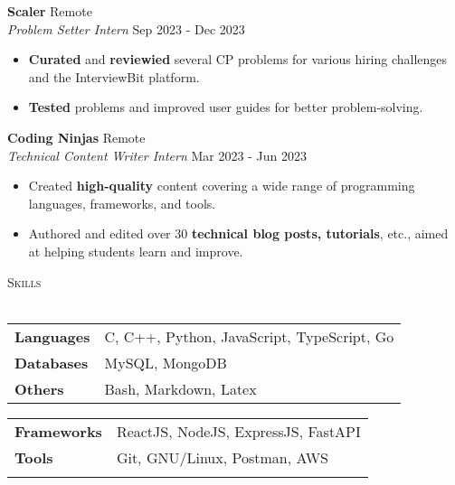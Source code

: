 \documentclass[a4paper]{article}
\newcommand{\bulletSep} { \vspace{2mm} }
\newcommand{\sectionSep} { \vspace{3mm} }
\newcommand{\lineunder} {
    \vspace*{-8pt} \\
    \hspace*{-15pt} \hrulefill \\
}
\newcommand{\header} [1] {
    {\hspace*{-18pt}\vspace*{6pt} {
        \fontfamily{qcs}\selectfont \large \scshape #1
    }}
    \vspace*{-6pt} \lineunder
    \vspace{1.1mm}
}
\newcommand{\experienceItem}[5]{
    \textbf{#1} \hfill #2 \\
    \textit{#3} \hfill #4 \\
    #5
}
\begin{document}
\experienceItem{Scaler}{Remote}{Problem Setter Intern}{Sep 2023 - Dec 2023}{
    \begin{itemize}
        \item \textbf{Curated} and \textbf{reviewied} several CP problems for various hiring challenges and the InterviewBit platform.
        \item \textbf{Tested} problems and improved user guides for better problem-solving.
    \end{itemize}
}
\bulletSep

\experienceItem{Coding Ninjas}{Remote}{Technical Content Writer Intern}{Mar 2023 - Jun 2023}{
    \begin{itemize}
        \item Created \textbf{high-quality} content covering a wide range of programming languages, frameworks, and tools.
        \item Authored and edited over 30 \textbf{technical blog posts, tutorials}, etc., aimed at helping students learn and improve.
    \end{itemize}
}

\sectionSep


\header{Skills}
\begin{minipage}[t]{0.51\textwidth}
    \begin{tabular}{@{}ll}
        \textbf{Languages} & C, C++, Python, JavaScript, TypeScript, Go \\
        \textbf{Databases} & MySQL, MongoDB                             \\
        \textbf{Others}    & Bash, Markdown, Latex
    \end{tabular}
\end{minipage}
\hfill
\begin{minipage}[t]{0.47\textwidth}
    \begin{tabular}{@{}ll}
        \textbf{Frameworks} & ReactJS, NodeJS, ExpressJS, FastAPI \\
        \textbf{Tools}      & Git, GNU/Linux, Postman, AWS        \\
        \textbf{}           &                                     \\
    \end{tabular}
\end{minipage}
\sectionSep
\end{document}
